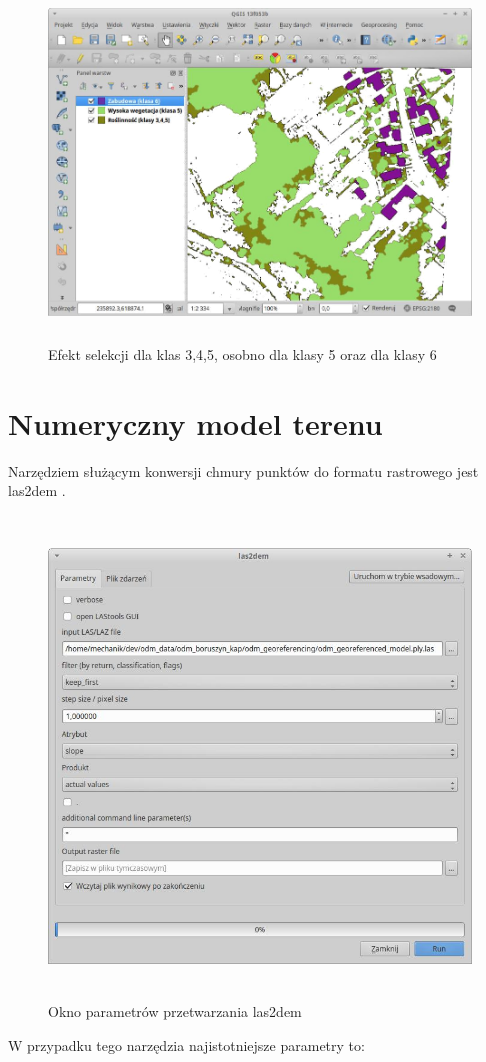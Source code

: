 \documentclass[12pt,a4paper]{book}
\begin{document}
\begin{center}
\begin{figure}
\includegraphics[width=13cm,height=9.426cm]{005-klasy.png}
\caption{Efekt selekcji dla klas 3,4,5, osobno dla klasy 5 oraz dla klasy 6}
\end{figure}
\end{center}

\section{Numeryczny model terenu}
Narzędziem służącym konwersji chmury punktów do formatu rastrowego jest  las2dem .

\begin{center}
\begin{figure}
\includegraphics[width=13cm,height=12.771cm]{005-lasdem.jpg}
\caption{Okno parametrów przetwarzania las2dem}
\end{figure}
\end{center}
W przypadku tego narzędzia najistotniejsze parametry to:
\end{document}
